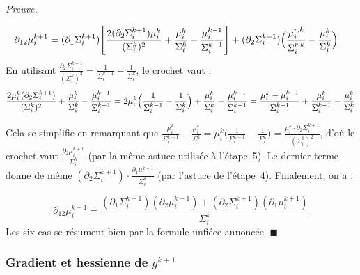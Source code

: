 \documentclass[12pt]{article}
\renewcommand{\qedsymbol}{$\blacksquare$}
\renewenvironment{proof}[1][\proofname]{%
  \par\medskip\noindent
  \textit{\color{proofgray}#1.}\enspace\ignorespaces
}{\hfill\qedsymbol\par\medskip}
\renewcommand{\proofname}{Preuve}
\begin{document}
\begin{proof}
\begin{equation*}
    \begin{aligned}
\partial_{12} \mu_i^{k+1} &= (\partial_1 \Sigma_i^{k+1})\Biggl[\frac{2(\partial_2\Sigma_i^{k+1})\mu_i^k}{(\Sigma_i^k)^2} + \frac{\mu_i^{k}}{\Sigma_i^{k}} -  \frac{\mu_i^{k-1}}{\Sigma_i^{k-1}}\Biggr] + (\partial_2 \Sigma_i^{k+1}) \Bigl(
    \frac{\mu_i^{r,k}}{\Sigma_i^{r,k}} -  \frac{\mu_i^{k}}{\Sigma_i^{k}}
\Bigr)
    \end{aligned}
\end{equation*}
En utilisant $\frac{\partial_2\Sigma_i^{k+1}}{(\Sigma_i^k)^2} = \frac{1}{\Sigma_i^{k-1}} - \frac{1}{\Sigma_i^k}$, le crochet vaut :
\begin{equation*}
\frac{2\mu_i^k(\partial_2\Sigma_i^{k+1})}{(\Sigma_i^k)^2} + \frac{\mu_i^k}{\Sigma_i^k} - \frac{\mu_i^{k-1}}{\Sigma_i^{k-1}} = 2\mu_i^k\Bigl(\frac{1}{\Sigma_i^{k-1}} - \frac{1}{\Sigma_i^k}\Bigr) + \frac{\mu_i^k}{\Sigma_i^k} - \frac{\mu_i^{k-1}}{\Sigma_i^{k-1}} = \frac{\mu_i^k - \mu_i^{k-1}}{\Sigma_i^{k-1}} + \frac{\mu_i^k}{\Sigma_i^{k-1}} - \frac{\mu_i^k}{\Sigma_i^k}
\end{equation*}

Cela se simplifie en remarquant que $\frac{\mu_i^k}{\Sigma_i^{k-1}} - \frac{\mu_i^k}{\Sigma_i^k} = \mu_i^k\bigl(\frac{1}{\Sigma_i^{k-1}} - \frac{1}{\Sigma_i^k}\bigr) = \frac{\mu_i^k\cdot\partial_2\Sigma_i^{k+1}}{(\Sigma_i^k)^2}$, d'où le crochet vaut $\frac{\partial_2\mu_i^{k+1}}{\Sigma_i^k}$ (par la même astuce utilisée à l'étape~5). Le dernier terme donne de même $(\partial_2\Sigma_i^{k+1})\cdot\frac{\partial_1\mu_i^{k+1}}{\Sigma_i^k}$ (par l'astuce de l'étape~4). Finalement, on a :

\begin{equation*}
\partial_{12}\mu_i^{k+1} = \frac{(\partial_1\Sigma_i^{k+1})(\partial_2\mu_i^{k+1}) + (\partial_2\Sigma_i^{k+1})(\partial_1\mu_i^{k+1})}{\Sigma_i^k}
\end{equation*}
Les six cas se résument bien par la formule unfiéee annoncée.
\end{proof}





\subsubsection*{Gradient et hessienne de $g^{k+1}$}
\end{document}

